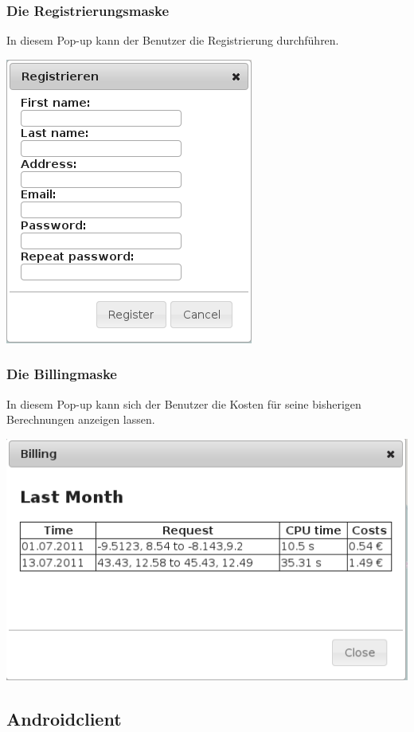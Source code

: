 \documentclass[a4paper,10pt,titlepage]{article}
\begin{document}
\subsubsection{Die Registrierungsmaske}
In diesem Pop-up kann der Benutzer die Registrierung durchführen.
\begin {center}
\includegraphics[scale=0.5]{media/web/Register.png}
\end {center}
\subsubsection{Die Billingmaske}
In diesem Pop-up kann sich der Benutzer die Kosten für seine bisherigen Berechnungen anzeigen lassen.
\begin {center}
\includegraphics[scale=0.5]{media/web/Billing.png}
\end {center}

\newpage
\subsection{Androidclient}
\end{document}

